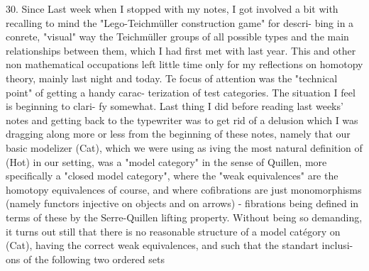 30. Since Last week when I stopped with my notes, I got involved a bit
with recalling to mind the "Lego-Teichmüller construction game" for descri-%
bing in a conrete, "visual" way the Teichmüller groups of all possible
types and the main relationships between them, which I had first met with
last year. This and other non mathematical occupations left little time
only for my reflections on homotopy theory,  mainly last night and today.
Te focus of attention was the "technical point" of getting a handy carac-%
terization of test categories. The situation I feel is beginning to clari-%
fy somewhat. Last thing I did\hand{,} before reading last weeks' notes and getting
back to the typewriter\hand{,} was to get rid of a delusion which I was dragging
along more or less from the beginning of these notes, namely that our
basic modelizer (Cat), which we were using  as iving the most
natural definition of (Hot) in our setting, was a "model category" in the
sense of Quillen, more specifically a "closed model category", where
the "weak equivalences" are the homotopy equivalences of course, and where
cofibrations are just monomorphisms (namely functors injective on objects
and on arrows) - fibrations being defined in terms of these by the
 Serre-Quillen lifting property. Without being so demanding, it turns out
still that there is no reasonable structure of a model catégory on (Cat),
having the correct weak equivalences, and such that the standart  inclusi-%
ons of the following two ordered sets
